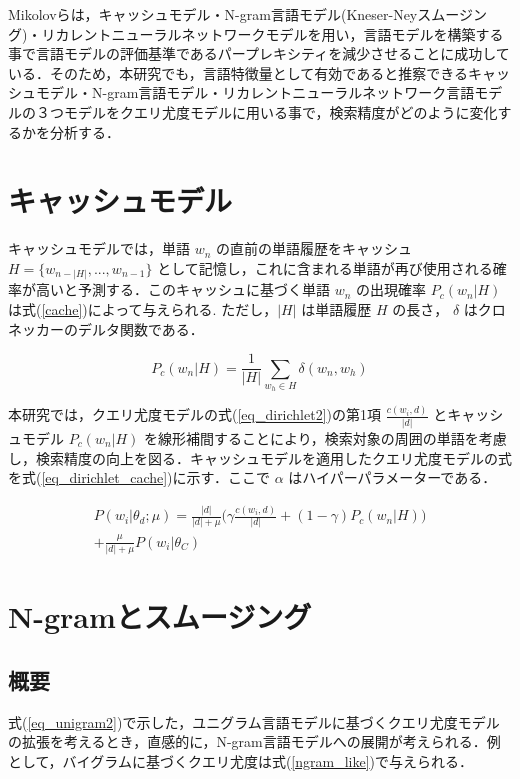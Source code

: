 Mikolovら\cite{mikolov}は，キャッシュモデル・N-gram言語モデル(Kneser-Neyスムージング)・リカレントニューラルネットワークモデルを用い，言語モデルを構築する事で言語モデルの評価基準であるパープレキシティを減少させることに成功している．そのため，本研究でも，言語特徴量として有効であると推察できるキャッシュモデル・N-gram言語モデル・リカレントニューラルネットワーク言語モデルの３つモデルをクエリ尤度モデルに用いる事で，検索精度がどのように変化するかを分析する．

\section{キャッシュモデル}
キャッシュモデルでは，単語 $w_n$ の直前の単語履歴をキャッシュ $H = \{ w_{n-|H|}, ..., w_{n-1}\} $ として記憶し，これに含まれる単語が再び使用される確率が高いと予測する．このキャッシュに基づく単語 $w_n$ の出現確率 $P_c(w_n|H)$ は式(\ref{cache})によって与えられる. ただし，$|H|$ は単語履歴 $H$ の長さ， $\delta$ はクロネッカーのデルタ関数である．

\begin{equation}
		P_c(w_n|H) = \frac{1}{|H|} \sum_{w_h \in H} \delta (w_n, w_h)
    \label{cache}
\end{equation}

本研究では，クエリ尤度モデルの式(\ref{eq_dirichlet2})の第1項 $\frac{c(w_i, d)}{|d|}$ とキャッシュモデル $P_c(w_n|H)$ を線形補間することにより，検索対象の周囲の単語を考慮し，検索精度の向上を図る．キャッシュモデルを適用したクエリ尤度モデルの式を式(\ref{eq_dirichlet_cache})に示す．ここで $\alpha$ はハイパーパラメーターである．

\begin{equation}
\begin{split}
    P(w_i|\theta_d;\mu) = \frac{|d|}{|d|+\mu} \Biggl( \gamma \frac{c(w_i, d)}{|d|} + (1 - \gamma) P_c(w_n|H) \Biggr)\\
    + \frac{\mu}{|d|+\mu} P(w_i|\theta_C)  
    \label{eq_dirichlet_cache}
\end{split}
\end{equation}

\section{N-gramとスムージング}
\subsection{概要}
式(\ref{eq_unigram2})で示した，ユニグラム言語モデルに基づくクエリ尤度モデルの拡張を考えるとき，直感的に，N-gram言語モデルへの展開が考えられる．例として，バイグラムに基づくクエリ尤度は式(\ref{ngram_like})で与えられる．\cite{bigram}

